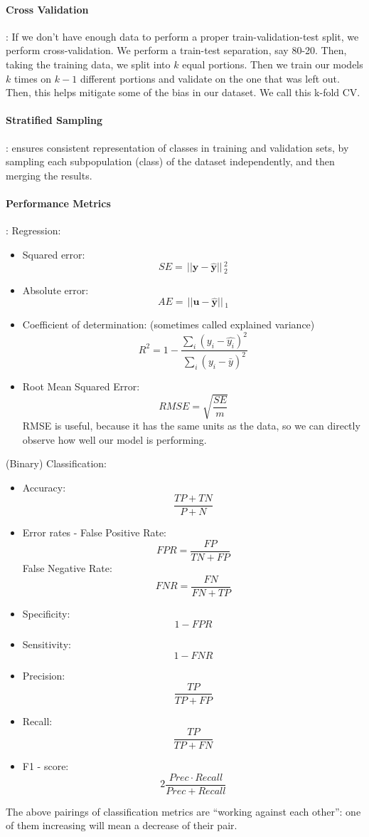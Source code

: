 \documentclass{article}
\renewcommand{\vec}[1]{\mathbf{#1}}
\renewcommand{\|}{\,\,|\,\,}
\newcommand{\norm}[1]{\,||#1||\,}
\begin{document}
\paragraph{Cross Validation}:
If we don't have enough data to perform a proper train-validation-test split, we
perform cross-validation. We perform a train-test separation, say 80-20.
Then, taking the training data, we split into $k$ equal portions. Then we train
our models $k$ times on $k - 1$ different portions and validate on the one that
was left out. Then, this helps mitigate some of the bias in our dataset. We call
this k-fold CV.
\paragraph{Stratified Sampling}: ensures consistent representation of classes in
training and validation sets, by sampling each subpopulation (class) of the
dataset independently, and then merging the results.
\paragraph{Performance Metrics}:
Regression:
\begin{itemize}
\item Squared error:
  \[
    SE = \norm{\vec{y} - \hat{\vec{y}}}^2_2
  \]
\item Absolute error:
  \[
    AE = \norm{\vec{u} - \hat{\vec{y}}}_1
  \]
\item Coefficient of determination: (sometimes called explained variance)
  \[
    R^2 = 1 - \frac{\sum_i (y_i - \hat{y_i})^2}{\sum_i (y_i - \bar{y})^2}
  \]
\item Root Mean Squared Error:
  \[
    RMSE = \sqrt{\frac{SE}{m}}
  \]
  RMSE is useful, because it has the same units as the data, so we can
  directly observe how well our model is performing.
\end{itemize}
(Binary) Classification:
\begin{itemize}
\item Accuracy:
  \[
    \frac{TP + TN}{P + N}
  \]
\item Error rates - False Positive Rate:
  \[
    FPR = \frac{FP}{TN + FP}
  \]
  False Negative Rate:
  \[
    FNR = \frac{FN}{FN + TP}
  \]
\item Specificity:
  \[
    1 - FPR
  \]
\item Sensitivity:
  \[
    1 - FNR
  \]
\item Precision:
  \[
    \frac{TP}{TP + FP}
  \]
\item Recall:
  \[
    \frac{TP}{TP + FN}
  \]
\item F1 - score:
  \[
    2\frac{Prec \cdot Recall}{Prec + Recall}
  \]
\end{itemize}
The above pairings of classification metrics are ``working against each other'':
one of them increasing will mean a decrease of their pair.
\end{document}
